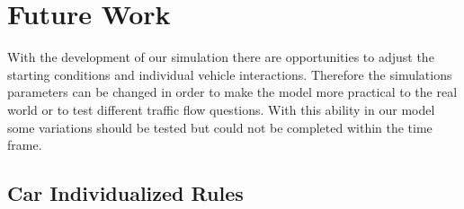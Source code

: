 \documentclass{amsart}
\begin{document}
\section{\bfseries{Future Work}}
	With the development of our simulation there are opportunities to adjust the starting conditions and individual vehicle interactions.  Therefore the simulations parameters can be changed in order to make the model more practical to the real world or to test different traffic flow questions.  With this ability in our model some variations should be tested but could not be completed within the time frame.  
	\subsection{Car Individualized Rules}
\end{document}
